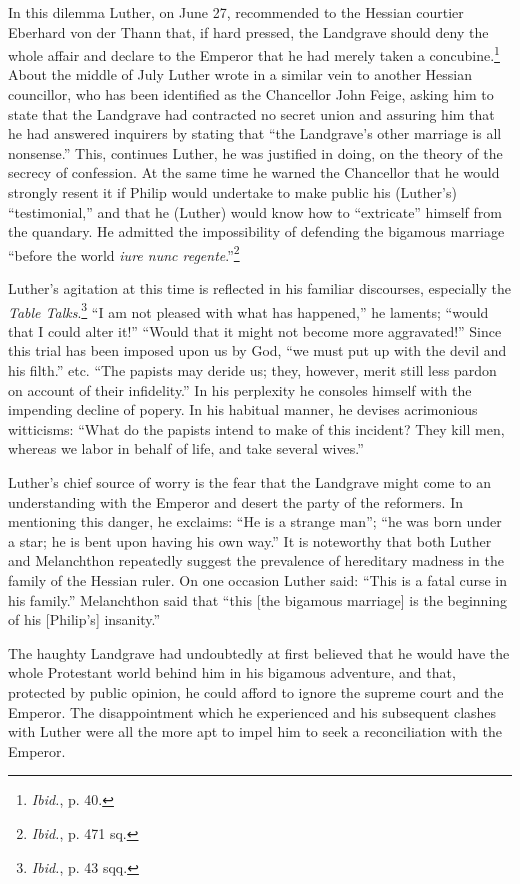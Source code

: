 In this dilemma Luther, on June 27, recommended to the Hessian
courtier Eberhard von der Thann that, if hard pressed, the Landgrave
should deny the whole affair and declare to the Emperor that he had
merely taken a concubine.\footnote{\textit{Ibid.}, p. 40.}
 About the middle of July Luther wrote
in a similar vein to another Hessian councillor, who has been identified
as the Chancellor John Feige, asking him to state that the Landgrave had
contracted no secret union and assuring him that he had
answered inquirers by stating that “the Landgrave’s other marriage is
all nonsense.” This, continues Luther, he was justified in doing, on
the theory of the secrecy of confession. At the same time he warned
the Chancellor that he would strongly resent it if Philip would undertake
to make public his (Luther’s) “testimonial,” and that he (Luther) would
know how to ``extricate'' himself from the quandary. He
admitted the impossibility of defending the bigamous marriage “before
the world \textit{iure nunc regente}.”\footnote{\textit{Ibid.}, p. 471 sq.}

Luther’s agitation at this time is reflected in his familiar discourses,
especially the \textit{Table Talks}.\footnote{\textit{Ibid.}, p. 43 sqq.}
“I am not pleased with what has happened,” he
laments; “would that I could alter it!” “Would that it might not become
more aggravated!” Since this trial has been imposed upon us by God, “we
must put up with the devil and his filth.” etc. “The papists may deride us;
they, however, merit still less pardon on account of their infidelity.” In his
perplexity he consoles himself with the impending decline of popery. In his
habitual manner, he devises acrimonious witticisms: “What do the papists
intend to make of this incident? They kill men, whereas we labor in behalf
of life, and take several wives.”

Luther’s chief source of worry is the fear that the Landgrave might come
to an understanding with the Emperor and desert the party of the reformers.
In mentioning this danger, he exclaims: “He is a strange man”; “he was born
under a star; he is bent upon having his own way.” It is noteworthy that
both Luther and Melanchthon repeatedly suggest the prevalence of hereditary
madness in the family of the Hessian ruler. On one occasion Luther
said: “This is a fatal curse in his family.” Melanchthon said that “this [the
bigamous marriage] is the beginning of his [Philip’s] insanity.”

The haughty Landgrave had undoubtedly at first believed that he would
have the whole Protestant world behind him in his bigamous adventure, and
that, protected by public opinion, he could afford to ignore the supreme
court and the Emperor. The disappointment which he experienced and his
subsequent clashes with Luther were all the more apt to impel him to seek
a reconciliation with the Emperor.

